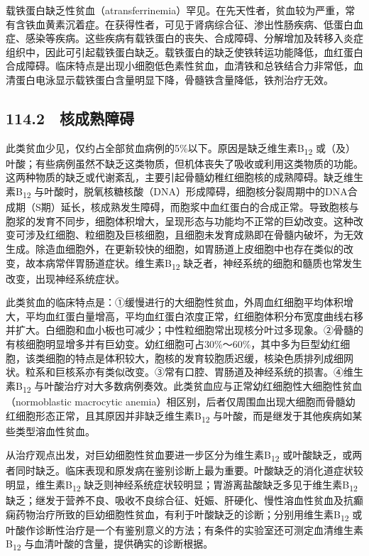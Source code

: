 载铁蛋白缺乏性贫血（atransferrinemia）罕见。在先天性者，贫血较为严重，常有含铁血黄素沉着症。在获得性者，可见于肾病综合征、渗出性肠疾病、低蛋白血症、感染等疾病。这些疾病有载铁蛋白的丧失、合成障碍、分解增加及转移入炎症组织中，因此可引起载铁蛋白缺乏。载铁蛋白的缺乏使铁转运功能降低，血红蛋白合成障碍。临床特点是出现小细胞低色素性贫血，血清铁和总铁结合力非常低，血清蛋白电泳显示载铁蛋白含量明显下降，骨髓铁含量降低，铁剂治疗无效。

\subsection{114.2　核成熟障碍}

此类贫血少见，仅约占全部贫血病例的5\%以下。原因是缺乏维生素B\textsubscript{12}
或（及）叶酸；有些病例虽然不缺乏这类物质，但机体丧失了吸收或利用这类物质的功能。这两种物质的缺乏或代谢紊乱，主要引起骨髓幼稚红细胞核的成熟障碍。缺乏维生素B\textsubscript{12}
与叶酸时，脱氧核糖核酸（DNA）形成障碍，细胞核分裂周期中的DNA合成期（S期）延长，核成熟发生障碍，而胞浆中血红蛋白的合成正常。导致胞核与胞浆的发育不同步，细胞体积增大，呈现形态与功能均不正常的巨幼改变。这种改变可涉及红细胞、粒细胞及巨核细胞，且细胞未发育成熟即在骨髓内破坏，为无效生成。除造血细胞外，在更新较快的细胞，如胃肠道上皮细胞中也存在类似的改变，故本病常伴胃肠道症状。维生素B\textsubscript{12}
缺乏者，神经系统的细胞和髓质也常发生改变，出现神经系统症状。

此类贫血的临床特点是：①缓慢进行的大细胞性贫血，外周血红细胞平均体积增大，平均血红蛋白量增高，平均血红蛋白浓度正常，红细胞体积分布宽度曲线右移并扩大。白细胞和血小板也可减少；中性粒细胞常出现核分叶过多现象。②骨髓的有核细胞明显增多并有巨幼变。幼红细胞可占30\%～60\%，其中多为巨型幼红细胞，该类细胞的特点是体积较大，胞核的发育较胞质迟缓，核染色质排列成细网状。粒系和巨核系亦有类似改变。③常有口腔、胃肠道及神经系统的损害。④维生素B\textsubscript{12}
与叶酸治疗对大多数病例奏效。此类贫血应与正常幼红细胞性大细胞性贫血（normoblastic
macrocytic
anemia）相区别，后者仅周围血出现大细胞而骨髓幼红细胞形态正常，且其原因并非缺乏维生素B\textsubscript{12}
与叶酸，而是继发于其他疾病如某些类型溶血性贫血。

从治疗观点出发，对巨幼细胞性贫血要进一步区分为维生素B\textsubscript{12}
或叶酸缺乏，或两者同时缺乏。临床表现和原发病在鉴别诊断上最为重要。叶酸缺乏的消化道症状较明显，维生素B\textsubscript{12}
缺乏则神经系统症状较明显；胃游离盐酸缺乏多见于维生素B\textsubscript{12}
缺乏；继发于营养不良、吸收不良综合征、妊娠、肝硬化、慢性溶血性贫血及抗癫痫药物治疗所致的巨幼细胞性贫血，有利于叶酸缺乏的诊断；分别用维生素B\textsubscript{12}
或叶酸作诊断性治疗是一个有鉴别意义的方法；有条件的实验室还可测定血清维生素B\textsubscript{12}
与血清叶酸的含量，提供确实的诊断根据。

